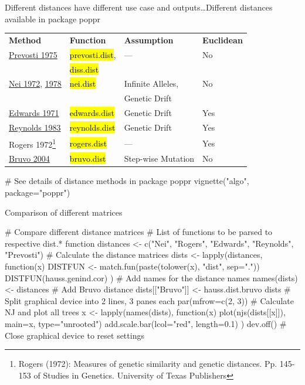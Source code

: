 \documentclass[compress, ucs, xelatex, 11pt, xcolor=svgnames,
	hyperref={
		bookmarks=true,
		unicode=true,
		colorlinks=true,
		pdftitle={Molecular data in R},
		plainpages=false,
		pdfauthor={Vojtech Zeisek},
		pdfsubject={Course about phylogeny and evolution in R},
		pdfcreator={XeLaTeX},
		pdfkeywords={R, evolution, phylogeny, molecular data},
		linkcolor=Tomato,
		anchorcolor=SaddleBrown,
		citecolor=Goldenrod,
		filecolor=DarkMagenta,
		menucolor=Sienna,
		urlcolor=DarkTurquoise,
		pdftex},
	url={hyphens, lowtilde} %
	]{beamer}
\renewcommand{\texttt}[1]{\hl{\ttfamily #1}}
\begin{document}
\begin{frame}[fragile]{Different distances have different use case and outputs\ldots}{Different distances available in package poppr}
	\vfill
	\begin{tabular}{llll}
		\textbf{Method} & \textbf{Function} & \textbf{Assumption} & \textbf{Euclidean}\\
		\href{https://link.springer.com/article/10.1007/BF00831894}{Prevosti 1975} & \texttt{prevosti.dist}, & --- & \alert{No}\\
			& \texttt{diss.dist} & & \\
		\href{https://www.jstor.org/stable/2459777}{Nei 1972}, \href{http://www.genetics.org/content/89/3/583.short}{1978} & \texttt{nei.dist} & Infinite Alleles, & \alert{No}\\
			& & Genetic Drift & \\
		\href{https://www.jstor.org/stable/2528824}{Edwards 1971} & \texttt{edwards.dist} & Genetic Drift & Yes\\
		\href{http://www.genetics.org/node/324318.full}{Reynolds 1983} & \texttt{reynolds.dist} & Genetic Drift & Yes\\
		Rogers 1972\footnote{Rogers (1972): Measures of genetic similarity and genetic distances. Pp. 145-153 of Studies in Genetics. University of Texas Publishers} & \texttt{rogers.dist} & --- & Yes\\
		\href{http://onlinelibrary.wiley.com/doi/10.1111/j.1365-294X.2004.02209.x/full}{Bruvo 2004} & \texttt{bruvo.dist} & Step-wise Mutation & \alert{No}
	\end{tabular}
	\vfill
	\begin{spluscode}
    # See details of distance methods in package poppr
    vignette("algo", package="poppr")
	\end{spluscode}
	\vfill
\end{frame}

\begin{frame}[fragile]{Comparison of different matrices}
	\begin{spluscode}
    # Compare different distance matrices
    # List of functions to be parsed to respective dist.* function
    distances <- c("Nei", "Rogers", "Edwards", "Reynolds", "Prevosti")
    # Calculate the distance matrices
    dists <- lapply(distances, function(x) {
      DISTFUN <- match.fun(paste(tolower(x), "dist", sep="."))
      DISTFUN(hauss.genind.cor) })
    # Add names for the distance names
    names(dists) <- distances
    # Add Bruvo distance
    dists[["Bruvo"]] <- hauss.dist.bruvo
    dists
    # Split graphical device into 2 lines, 3 panes each
    par(mfrow=c(2, 3))
    # Calculate NJ and plot all trees
    x <- lapply(names(dists), function(x) {
      plot(njs(dists[[x]]), main=x, type="unrooted")
      add.scale.bar(lcol="red", length=0.1) })
    dev.off() # Close graphical device to reset settings
	\end{spluscode}
\end{frame}
\end{document}
